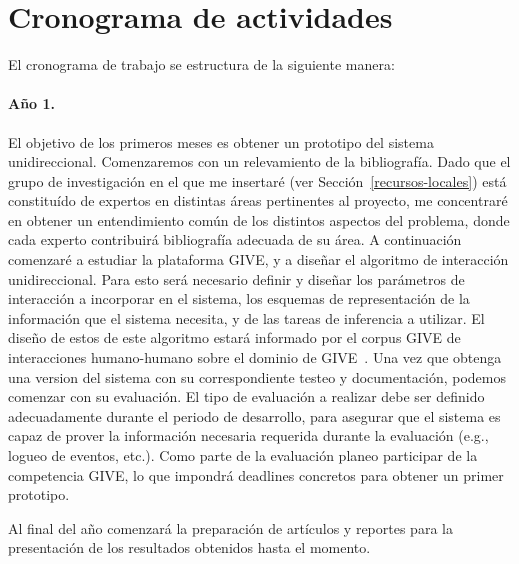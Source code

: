 \documentclass[11pt]{article}
\begin{document}
\section{Cronograma de actividades} \label{cronograma}



El cronograma de trabajo se estructura de la siguiente manera:

\paragraph{A\~no 1.} El objetivo de los primeros meses es obtener un
prototipo del sistema unidireccional.  Comenzaremos con un relevamiento
de la bibliograf\'ia.  Dado que el grupo de investigaci\'on en el que me
insertar\'e (ver Secci\'on~\ref{recursos-locales}) est\'a
constitu\'ido de expertos en distintas \'areas pertinentes al
proyecto, me concentrar\'e en obtener un
entendimiento com\'un de los distintos aspectos del problema, donde
cada experto contribuir\'a bibliograf\'ia adecuada de su \'area.  A
continuaci\'on comenzar\'e a estudiar
la plataforma GIVE, y a dise\~nar el algoritmo de interacci\'on
unidireccional.  Para esto ser\'a necesario definir y dise\~nar los
par\'ametros de interacci\'on a incorporar
en el sistema, los esquemas de representaci\'on de la
informaci\'on que el sistema necesita, y de las tareas de inferencia a
utilizar. El dise\~no de estos de este algoritmo estar\'a informado por el
corpus GIVE de interacciones humano-humano sobre el dominio de
GIVE~\citep{gargett10}.
Una vez que obtenga una version del sistema con su
correspondiente testeo y documentaci\'on, podemos comenzar con
su evaluaci\'on.  El tipo de evaluaci\'on a realizar debe ser definido
adecuadamente durante el periodo de desarrollo, para asegurar que el sistema
es capaz de prover la informaci\'on necesaria requerida durante la evaluaci\'on
(e.g., logueo de eventos, etc.). Como parte de la evaluaci\'on planeo participar
de la competencia GIVE, lo que impondr\'a deadlines concretos para obtener
un primer prototipo. 

Al final del a\~no comenzar\'a la preparaci\'on de art\'iculos y reportes para
la presentaci\'on de los resultados obtenidos hasta el momento.
\end{document}
